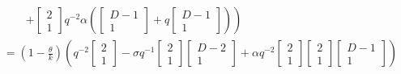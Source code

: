 \documentclass[
]{book}
\theoremstyle{definition}
\theoremstyle{definition}
\theoremstyle{definition}
\theoremstyle{definition}
\theoremstyle{remark}
\begin{document}
\begin{align}
& \qquad \left. +\begin{bmatrix}{2}\\{1}\end{bmatrix}q^{-2}\alpha\left(\begin{bmatrix}{D-1}\\{1}\end{bmatrix}+q\begin{bmatrix}{D-1}\\{1}\end{bmatrix}\right)\right)\\
& = \left(1-\frac{\theta}{k}\right)\left(q^{-2}\begin{bmatrix}{2}\\{1}\end{bmatrix}-\sigma q^{-1}\begin{bmatrix}{2}\\{1}\end{bmatrix}\begin{bmatrix}{D-2}\\{1}\end{bmatrix}+\alpha q^{-2}\begin{bmatrix}{2}\\{1}\end{bmatrix}\begin{bmatrix}{2}\\{1}\end{bmatrix}\begin{bmatrix}{D-1}\\{1}\end{bmatrix}\right)
\end{align}
\end{document}
